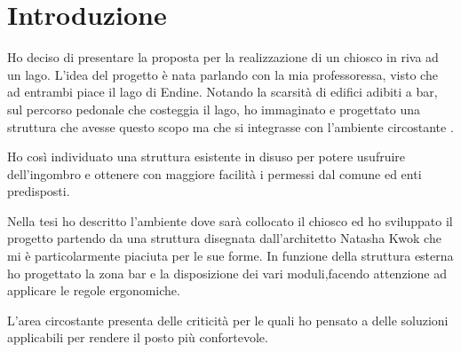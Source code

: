 \section{Introduzione}
Ho deciso di presentare la proposta per la realizzazione di un chiosco in riva ad un lago.
L'idea del progetto è nata parlando con la mia professoressa, visto che ad entrambi piace il lago di Endine.
Notando  la scarsità di edifici adibiti a bar, sul percorso pedonale che costeggia il lago, ho immaginato e progettato una struttura che avesse questo scopo ma che si integrasse con l’ambiente circostante .

Ho così individuato una struttura esistente in disuso per potere usufruire dell'ingombro e ottenere con maggiore facilità i permessi dal comune ed enti predisposti. 


Nella tesi ho descritto l’ambiente dove sarà collocato il chiosco ed ho sviluppato il progetto partendo da una struttura disegnata dall'architetto Natasha Kwok che mi è particolarmente piaciuta per le sue forme.
In funzione della struttura esterna ho progettato  la zona bar e la disposizione dei vari moduli,facendo attenzione ad applicare le regole ergonomiche.

L'area circostante presenta delle criticità per le quali ho pensato a delle soluzioni applicabili per rendere il posto più confortevole.
